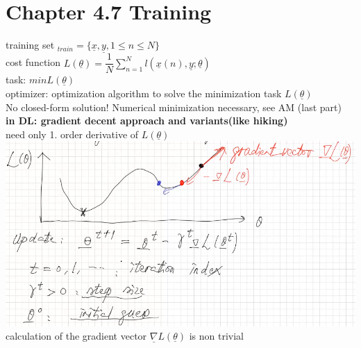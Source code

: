 \section{Chapter 4.7 Training}
\textbullet training set $ _{train} = \lbrace \underline{x} , \underline{y } , 1 \leq n \leq N \rbrace $\\
\textbullet cost function $ L(\underline{\theta}) = \dfrac{1}{N} \sum_{n=1}^{N} l(\underline{x}(n),\underline{y}; \underline{\theta}) $ \\
\textbullet task: $ min L(\underline{\theta}) $\\
\textbullet optimizer: optimization algorithm to solve the minimization task $ L(\underline{\theta}) $ \\
No closed-form solution! Numerical minimization necessary, see AM (last part) \\
\textbf{in DL: gradient decent approach and variants(like hiking)}\\
need only 1. order derivative of $ L(\underline{\theta}) $ \\
\includegraphics[width = \linewidth]{Images/GradientDescent.png}\\
calculation of the gradient vector $  \underline{\nabla} L(\underline{\theta}) $ is non trivial \\
